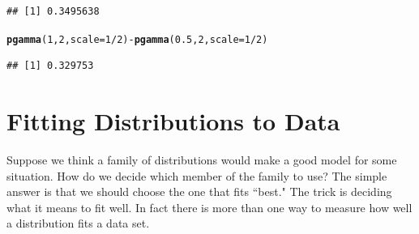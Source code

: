 \documentclass[twoside]{book}\usepackage[]{graphicx}\usepackage[]{xcolor}
\makeatletter
\newcommand{\hlnum}[1]{\textcolor[rgb]{0.686,0.059,0.569}{#1}}%
\newcommand{\hlopt}[1]{\textcolor[rgb]{0,0,0}{#1}}%
\newcommand{\hlstd}[1]{\textcolor[rgb]{0.345,0.345,0.345}{#1}}%
\newcommand{\hlkwc}[1]{\textcolor[rgb]{0.333,0.667,0.333}{#1}}%
\newcommand{\hlkwd}[1]{\textcolor[rgb]{0.737,0.353,0.396}{\textbf{#1}}}%
\newenvironment{kframe}{%
 \def\at@end@of@kframe{}%
 \ifinner\ifhmode%
  \def\at@end@of@kframe{\end{minipage}}%
  \begin{minipage}{\columnwidth}%
 \fi\fi%
 \def\FrameCommand##1{\hskip\@totalleftmargin \hskip-\fboxsep
 \colorbox{shadecolor}{##1}\hskip-\fboxsep
     \hskip-\linewidth \hskip-\@totalleftmargin \hskip\columnwidth}%
 \MakeFramed {\advance\hsize-\width
   \@totalleftmargin\z@ \linewidth\hsize
   \@setminipage}}%
 {\par\unskip\endMakeFramed%
 \at@end@of@kframe}
\newenvironment{knitrout}{}{} %
\makeatother
\begin{document}
\begin{solution}
\begin{knitrout}
\begin{kframe}
\begin{verbatim}
## [1] 0.3495638
\end{verbatim}
\begin{alltt}
\hlkwd{pgamma}\hlstd{(}\hlnum{1}\hlstd{,} \hlnum{2}\hlstd{,} \hlkwc{scale} \hlstd{=} \hlnum{1}\hlopt{/}\hlnum{2}\hlstd{)} \hlopt{-} \hlkwd{pgamma}\hlstd{(}\hlnum{0.5}\hlstd{,} \hlnum{2}\hlstd{,} \hlkwc{scale} \hlstd{=} \hlnum{1}\hlopt{/}\hlnum{2}\hlstd{)}
\end{alltt}
\begin{verbatim}
## [1] 0.329753
\end{verbatim}
\end{kframe}
\end{knitrout}
\end{solution}



\section{Fitting Distributions to Data}

Suppose we think a family of distributions would make a good model for some 
situation.  How do we decide which member of the family to use?  The simple answer
is that we should choose the one that fits ``best."  The trick is deciding what it 
means to fit well.  In fact there is more than one way to measure how well 
a distribution fits a data set.  
\end{document}
